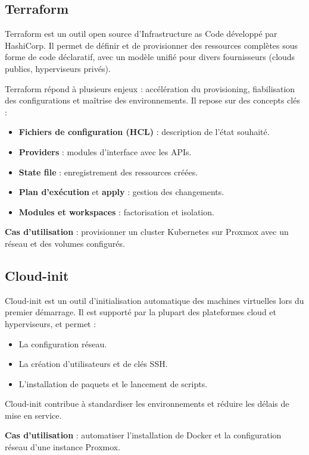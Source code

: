 \subsection{Terraform}

Terraform est un outil open source d’Infrastructure as Code développé par HashiCorp. Il permet de définir et de provisionner des ressources complètes sous forme de code déclaratif, avec un modèle unifié pour divers fournisseurs (clouds publics, hyperviseurs privés).

Terraform répond à plusieurs enjeux : accélération du provisioning, fiabilisation des configurations et maîtrise des environnements. Il repose sur des concepts clés :
\begin{itemize}
	\item \textbf{Fichiers de configuration (HCL)} : description de l’état souhaité.
	\item \textbf{Providers} : modules d’interface avec les APIs.
	\item \textbf{State file} : enregistrement des ressources créées.
	\item \textbf{Plan d’exécution} et \textbf{apply} : gestion des changements.
	\item \textbf{Modules et workspaces} : factorisation et isolation.
\end{itemize}

\textbf{Cas d’utilisation} : provisionner un cluster Kubernetes sur Proxmox avec un réseau et des volumes configurés.

\subsection{Cloud-init}

Cloud-init est un outil d’initialisation automatique des machines virtuelles lors du premier démarrage. Il est supporté par la plupart des plateformes cloud et hyperviseurs, et permet :
\begin{itemize}
	\item La configuration réseau.
	\item La création d’utilisateurs et de clés SSH.
	\item L’installation de paquets et le lancement de scripts.
\end{itemize}

Cloud-init contribue à standardiser les environnements et réduire les délais de mise en service.

\textbf{Cas d’utilisation} : automatiser l’installation de Docker et la configuration réseau d’une instance Proxmox.

